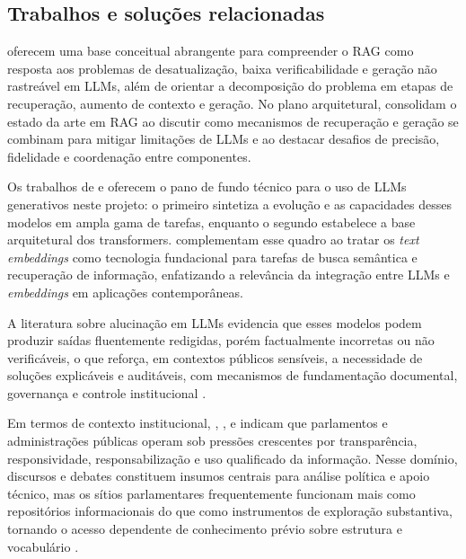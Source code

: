 \subsection{Trabalhos e soluções relacionadas}

\textcite{gao2023ragSurvey} oferecem uma base conceitual abrangente para compreender o RAG como resposta aos problemas de desatualização, baixa verificabilidade e geração não rastreável em LLMs, além de orientar a decomposição do problema em etapas de recuperação, aumento de contexto e geração. No plano arquitetural, \textcite{gupta2024comprehensiveRag} consolidam o estado da arte em RAG ao discutir como mecanismos de recuperação e geração se combinam para mitigar limitações de LLMs e ao destacar desafios de precisão, fidelidade e coordenação entre componentes.

Os trabalhos de \textcite{minaee2024llmSurvey} e \textcite{vaswani2017attention} oferecem o pano de fundo técnico para o uso de LLMs generativos neste projeto: o primeiro sintetiza a evolução e as capacidades desses modelos em ampla gama de tarefas, enquanto o segundo estabelece a base arquitetural dos transformers. \textcite{nie2024textEmbeddingSurvey} complementam esse quadro ao tratar os \textit{text embeddings} como tecnologia fundacional para tarefas de busca semântica e recuperação de informação, enfatizando a relevância da integração entre LLMs e \textit{embeddings} em aplicações contemporâneas.

A literatura sobre alucinação em LLMs evidencia que esses modelos podem produzir saídas fluentemente redigidas, porém factualmente incorretas ou não verificáveis, o que reforça, em contextos públicos sensíveis, a necessidade de soluções explicáveis e auditáveis, com mecanismos de fundamentação documental, governança e controle institucional \parencite{anhHoang2025hallucinations,gao2023ragSurvey,deAlmeidaSantos2025aiGovernance}.

Em termos de contexto institucional, \textcite{un2015responsiveGovernance}, \textcite{ipu2024aiParliaments}, \textcite{wfd2023guidelinesAiParliaments} e \textcite{geunis2023parliamentaryMonitoring} indicam que parlamentos e administrações públicas operam sob pressões crescentes por transparência, responsividade, responsabilização e uso qualificado da informação. Nesse domínio, discursos e debates constituem insumos centrais para análise política e apoio técnico, mas os sítios parlamentares frequentemente funcionam mais como repositórios informacionais do que como instrumentos de exploração substantiva, tornando o acesso dependente de conhecimento prévio sobre estrutura e vocabulário \parencite{skubicFiser2024discourseReview,bandeiraBernardes2016information}.

